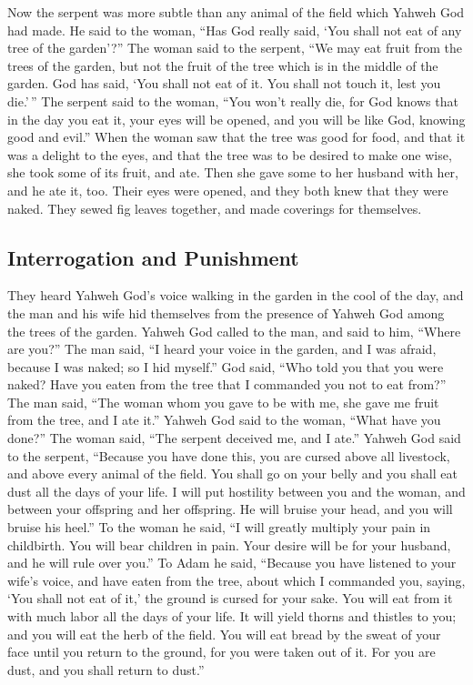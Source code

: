  Now the serpent was more subtle than any animal of the
field which Yahweh God had made. He said to the woman, ``Has God really
said, `You shall not eat of any tree of the garden'?'' 
The woman said to the serpent, ``We may eat fruit from the trees of the
garden,  but not the fruit of the tree which is in the
middle of the garden. God has said, `You shall not eat of it. You shall
not touch it, lest you die.'\,''  The serpent said to the
woman, ``You won't really die,  for God knows that in the
day you eat it, your eyes will be opened, and you will be like God,
knowing good and evil.''  When the woman saw that the tree
was good for food, and that it was a delight to the eyes, and that the
tree was to be desired to make one wise, she took some of its fruit, and
ate. Then she gave some to her husband with her, and he ate it, too.
 Their eyes were opened, and they both knew that they were
naked. They sewed fig leaves together, and made coverings for
themselves.

\hypertarget{interrogation-and-punishment}{%
\subsection{Interrogation and
Punishment}\label{interrogation-and-punishment}}

 They heard Yahweh God's voice walking in the garden in
the cool of the day, and the man and his wife hid themselves from the
presence of Yahweh God among the trees of the garden. 
Yahweh God called to the man, and said to him, ``Where are you?''
 The man said, ``I heard your voice in the garden, and I
was afraid, because I was naked; so I hid myself.''  God
said, ``Who told you that you were naked? Have you eaten from the tree
that I commanded you not to eat from?''  The man said,
``The woman whom you gave to be with me, she gave me fruit from the
tree, and I ate it.''  Yahweh God said to the woman,
``What have you done?'' The woman said, ``The serpent deceived me, and I
ate.''  Yahweh God said to the serpent, ``Because you
have done this, you are cursed above all livestock, and above every
animal of the field. You shall go on your belly and you shall eat dust
all the days of your life.  I will put hostility between
you and the woman, and between your offspring and her offspring. He will
bruise your head, and you will bruise his heel.''  To the
woman he said, ``I will greatly multiply your pain in childbirth. You
will bear children in pain. Your desire will be for your husband, and he
will rule over you.''  To Adam he said, ``Because you
have listened to your wife's voice, and have eaten from the tree, about
which I commanded you, saying, `You shall not eat of it,' the ground is
cursed for your sake. You will eat from it with much labor all the days
of your life.  It will yield thorns and thistles to you;
and you will eat the herb of the field.  You will eat
bread by the sweat of your face until you return to the ground, for you
were taken out of it. For you are dust, and you shall return to dust.''


